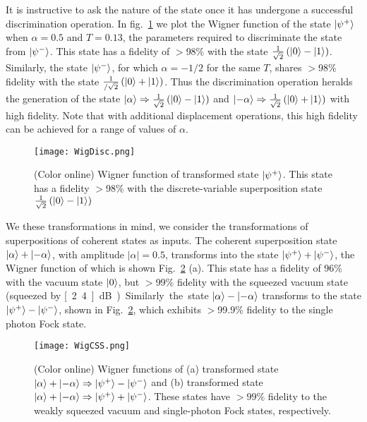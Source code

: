 \documentclass[aps,prl,twocolumn, superscriptaddress]{revtex4-1}
\begin{document}
It is instructive to ask the nature of the state once it has undergone a successful discrimination operation. In fig.~\ref{fig:WigDisc} we plot the Wigner function of the state $\ket{\psi^+}$ when $\alpha=0.5$ and $T=0.13$, the parameters required to discriminate the state from $\ket{\psi^-}$. This state has a fidelity of $>$98\% with the state $\tfrac{1}{\sqrt{2}}\left(\ket{0}-\ket{1}\right)$. Similarly, the state $\ket{\psi^-}$, for which $\alpha=-1/2$ for the same $T$, shares $>$98\% fidelity with the state  $\tfrac{1}{/\sqrt{2}}\left(\ket{0}+\ket{1}\right)$. Thus the discrimination operation heralds the generation of the state $\ket{\alpha}\Rightarrow \tfrac{1}{\sqrt{2}}\left(\ket{0}-\ket{1}\right)$ and $\ket{-\alpha}\Rightarrow \tfrac{1}{\sqrt{2}}\left(\ket{0}+\ket{1}\right)$ with high fidelity. Note that with additional displacement operations, this high fidelity can be achieved for a range of values of $\alpha$.%
\begin{figure}
\texttt{[image: WigDisc.png]}
\caption{(Color online) Wigner function of transformed state $\ket{\psi^+}$. This state has a fidelity $>$98\% with the discrete-variable superposition state $\tfrac{1}{\sqrt{2}}\left(\ket{0}-\ket{1}\right)$ }
\label{fig:WigDisc}
\end{figure}

We these transformations in mind, we consider the transformations of superpositions of coherent states as inputs. The coherent superposition state $\ket{\alpha}+\ket{-\alpha}$, with amplitude $|\alpha|=0.5$, transforms into the state $\ket{\psi^+}+\ket{\psi^-}$, the Wigner function of which is shown Fig.~\ref{fig:WigCSS} (a). This state has a fidelity of 96\% with the vacuum state $\ket{0}$, but $>$99\% fidelity with the squeezed vacuum state (squeezed by \unit[2.4]{dB}). Similarly the state $\ket{\alpha}-\ket{-\alpha}$ transforms to the state $\ket{\psi^+}-\ket{\psi^-}$, shown in Fig.~\ref{fig:WigCSS}, which exhibits $>$99.9\% fidelity to the single photon Fock state.

\begin{figure}
\texttt{[image: WigCSS.png]}
\caption{(Color online) Wigner functions of (a) transformed state $\ket{\alpha}+\ket{-\alpha}\Rightarrow\ket{\psi^+}-\ket{\psi^-}$ and (b) transformed state $\ket{\alpha}+\ket{-\alpha}\Rightarrow\ket{\psi^+}+\ket{\psi^-}$. These states have $>99\%$ fidelity to the weakly squeezed vacuum and single-photon Fock states, respectively.}
\label{fig:WigCSS}
\end{figure}
\end{document}
